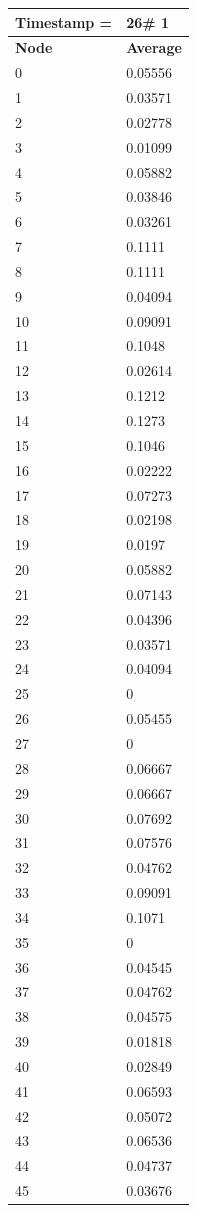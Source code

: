 \begin{tabular}{|l||l|}
\hline
\textbf{Timestamp =} & \textbf{26}\# 1\\\hline
	\textbf{Node} & \textbf{Average} \\ \hline
\hline
	0 & 0.05556 \\ \hline
	1 & 0.03571 \\ \hline
	2 & 0.02778 \\ \hline
	3 & 0.01099 \\ \hline
	4 & 0.05882 \\ \hline
	5 & 0.03846 \\ \hline
	6 & 0.03261 \\ \hline
	7 & 0.1111 \\ \hline
	8 & 0.1111 \\ \hline
	9 & 0.04094 \\ \hline
	10 & 0.09091 \\ \hline
	11 & 0.1048 \\ \hline
	12 & 0.02614 \\ \hline
	13 & 0.1212 \\ \hline
	14 & 0.1273 \\ \hline
	15 & 0.1046 \\ \hline
	16 & 0.02222 \\ \hline
	17 & 0.07273 \\ \hline
	18 & 0.02198 \\ \hline
	19 & 0.0197 \\ \hline
	20 & 0.05882 \\ \hline
	21 & 0.07143 \\ \hline
	22 & 0.04396 \\ \hline
	23 & 0.03571 \\ \hline
	24 & 0.04094 \\ \hline
	25 & 0 \\ \hline
	26 & 0.05455 \\ \hline
	27 & 0 \\ \hline
	28 & 0.06667 \\ \hline
	29 & 0.06667 \\ \hline
	30 & 0.07692 \\ \hline
	31 & 0.07576 \\ \hline
	32 & 0.04762 \\ \hline
	33 & 0.09091 \\ \hline
	34 & 0.1071 \\ \hline
	35 & 0 \\ \hline
	36 & 0.04545 \\ \hline
	37 & 0.04762 \\ \hline
	38 & 0.04575 \\ \hline
	39 & 0.01818 \\ \hline
	40 & 0.02849 \\ \hline
	41 & 0.06593 \\ \hline
	42 & 0.05072 \\ \hline
	43 & 0.06536 \\ \hline
	44 & 0.04737 \\ \hline
	45 & 0.03676 \\ \hline
\end{tabular}
